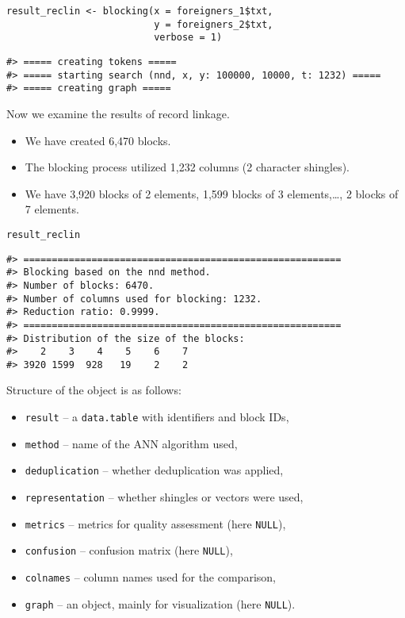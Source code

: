 \begin{verbatim}
result_reclin <- blocking(x = foreigners_1$txt,
                          y = foreigners_2$txt,
                          verbose = 1)
\end{verbatim}

\begin{verbatim}
#> ===== creating tokens =====
#> ===== starting search (nnd, x, y: 100000, 10000, t: 1232) =====
#> ===== creating graph =====
\end{verbatim}

Now we examine the results of record linkage.

\begin{itemize}
\tightlist
\item
  We have created
  6,470
  blocks.
\item
  The blocking process utilized
  1,232 columns (2
  character shingles).
\item
  We have 3,920 blocks of
  2 elements,
  1,599 blocks of
  3 elements,\ldots,
  2 blocks of
  7 elements.
\end{itemize}

\begin{verbatim}
result_reclin
\end{verbatim}

\begin{verbatim}
#> ========================================================
#> Blocking based on the nnd method.
#> Number of blocks: 6470.
#> Number of columns used for blocking: 1232.
#> Reduction ratio: 0.9999.
#> ========================================================
#> Distribution of the size of the blocks:
#>    2    3    4    5    6    7 
#> 3920 1599  928   19    2    2
\end{verbatim}

Structure of the object is as follows:

\begin{itemize}
\tightlist
\item
  \texttt{result} -- a \texttt{data.table} with identifiers and block IDs,
\item
  \texttt{method} -- name of the ANN algorithm used,
\item
  \texttt{deduplication} -- whether deduplication was applied,
\item
  \texttt{representation} -- whether shingles or vectors were used,
\item
  \texttt{metrics} -- metrics for quality assessment (here \texttt{NULL}),
\item
  \texttt{confusion} -- confusion matrix (here \texttt{NULL}),
\item
  \texttt{colnames} -- column names used for the comparison,
\item
  \texttt{graph} -- an  object, mainly for visualization
  (here \texttt{NULL}).
\end{itemize}

